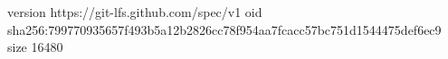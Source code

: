 version https://git-lfs.github.com/spec/v1
oid sha256:799770935657f493b5a12b2826cc78f954aa7fcacc57bc751d1544475def6ec9
size 16480
